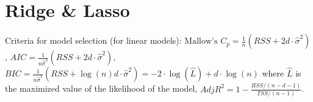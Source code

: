 \section{Ridge \& Lasso}
Criteria for model selection (for linear models): $\text{Mallow's }C_p=\frac 1 n (RSS + 2d\cdot \hat\sigma^2)$, $AIC = \frac{1}{n\hat\sigma^2}(RSS+2d\cdot\hat\sigma^2)$, $BIC= \frac{1}{n\hat\sigma^2}(RSS+\log(n)d\cdot\hat\sigma^2) = -2 \cdot\log(\hat L) + d\cdot\log(n)$ where $\hat L$ is the maximized value of the likelihood of the model, $AdjR^2=1-\frac{RSS / (n-d-1)}{TSS / (n-1)}$.
